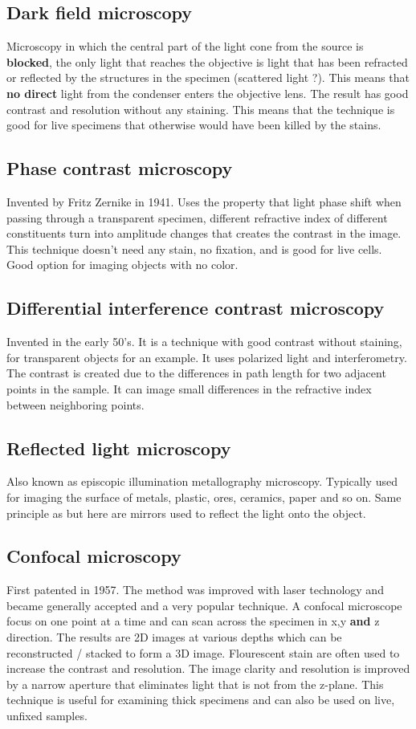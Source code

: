 	\subsection{Dark field microscopy}
	 Microscopy in which the central part of the light cone from the source is \textbf{blocked}, the only light that reaches the objective is light that has been refracted or reflected by the structures in the specimen (scattered light ?). This means that \textbf{no direct} light from the condenser enters the objective lens. The result has good contrast and resolution without any staining. This means that the technique is good for live specimens that otherwise would have been killed by the stains.  

	 \subsection{Phase contrast microscopy}
	 Invented by Fritz Zernike in 1941. Uses the property that light phase shift when passing through a transparent specimen, different refractive index of different constituents turn into amplitude changes that creates the contrast in the image. This technique doesn't need any stain, no fixation, and is good for live cells. Good option for imaging objects with no color. 

	 \subsection{Differential interference contrast microscopy}
	 Invented in the early 50's. It is a technique with good contrast without staining, for transparent objects for an example. It uses polarized light and interferometry. The contrast is created due to the differences in path length for two adjacent points in the sample. It can image small differences in the refractive index between neighboring points.

	 \subsection{Reflected light microscopy}
	 Also known as episcopic illumination metallography microscopy. Typically used for imaging the surface of metals, plastic, ores, ceramics, paper and so on. Same principle as but here are mirrors used to reflect the light onto the object. 

	 \subsection{Confocal microscopy}
	 First patented in 1957. The method was improved with laser technology and became generally accepted and a very popular technique. A confocal microscope focus on one point at a time and can scan across the specimen in x,y \textbf{and} z direction. The results are 2D images at various depths which can be reconstructed / stacked to form a 3D image. Flourescent stain are often used to increase the contrast and resolution. The image clarity and resolution is improved by a narrow aperture that eliminates light that is not from the z-plane. This technique is useful for examining thick specimens and can also be used on live, unfixed samples. 

